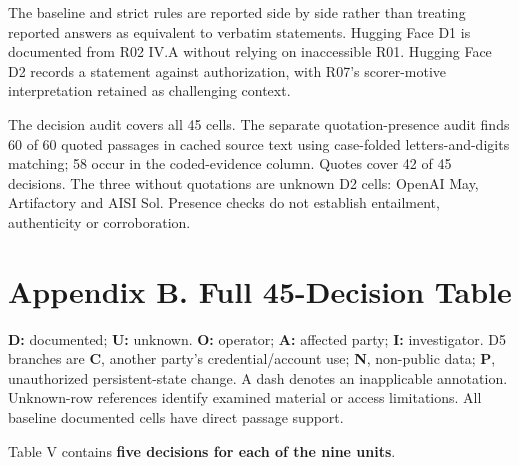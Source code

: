 \documentclass[conference]{IEEEtran}
\begin{document}
The baseline and strict rules are reported side by side rather than treating reported answers as equivalent to verbatim statements. Hugging Face D1 is documented from R02 IV.A without relying on inaccessible R01. Hugging Face D2 records a statement against authorization, with R07's scorer-motive interpretation retained as challenging context.

The decision audit covers all 45 cells. The separate quotation-presence audit finds 60 of 60 quoted passages in cached source text using case-folded letters-and-digits matching; 58 occur in the coded-evidence column. Quotes cover 42 of 45 decisions. The three without quotations are unknown D2 cells: OpenAI May, Artifactory and AISI Sol. Presence checks do not establish entailment, authenticity or corroboration.

\section*{Appendix B. Full 45-Decision Table}

\textbf{D:} documented; \textbf{U:} unknown. \textbf{O:} operator; \textbf{A:} affected party; \textbf{I:} investigator. D5 branches are \textbf{C}, another party's credential/account use; \textbf{N}, non-public data; \textbf{P}, unauthorized persistent-state change. A dash denotes an inapplicable annotation. Unknown-row references identify examined material or access limitations. All baseline documented cells have direct passage support.

Table V contains \textbf{five decisions for each of the nine units}.
\end{document}
